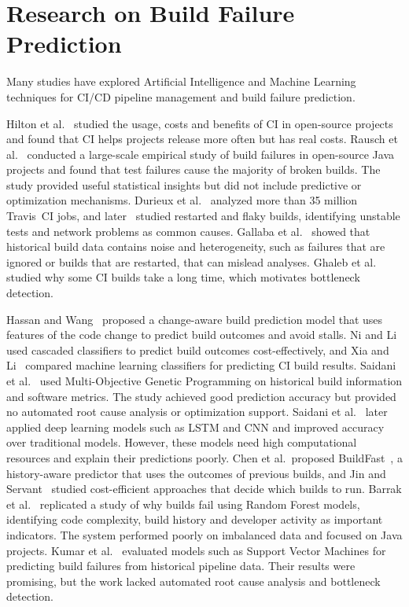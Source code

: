\section{Research on Build Failure Prediction}
\label{sec:research}
Many studies have explored Artificial Intelligence and Machine Learning techniques for CI/CD pipeline management and build failure prediction.

Hilton et al.~\cite{hilton2016usage} studied the usage, costs and benefits of CI in open-source projects and found that CI helps projects release more often but has real costs. Rausch et al.~\cite{rausch2017empirical} conducted a large-scale empirical study of build failures in open-source Java projects and found that test failures cause the majority of broken builds. The study provided useful statistical insights but did not include predictive or optimization mechanisms. Durieux et al.~\cite{durieux2019analysis} analyzed more than 35 million Travis~CI jobs, and later~\cite{durieux2020empirical} studied restarted and flaky builds, identifying unstable tests and network problems as common causes. Gallaba et al.~\cite{gallaba2018noise} showed that historical build data contains noise and heterogeneity, such as failures that are ignored or builds that are restarted, that can mislead analyses. Ghaleb et al.~\cite{ghaleb2019empirical} studied why some CI builds take a long time, which motivates bottleneck detection.

Hassan and Wang~\cite{hassan2017change} proposed a change-aware build prediction model that uses features of the code change to predict build outcomes and avoid stalls. Ni and Li~\cite{ni2017cost} used cascaded classifiers to predict build outcomes cost-effectively, and Xia and Li~\cite{xia2017could} compared machine learning classifiers for predicting CI build results. Saidani et al.~\cite{saidani2020predicting} used Multi-Objective Genetic Programming on historical build information and software metrics. The study achieved good prediction accuracy but provided no automated root cause analysis or optimization support. Saidani et al.~\cite{saidani2022improving} later applied deep learning models such as LSTM and CNN and improved accuracy over traditional models. However, these models need high computational resources and explain their predictions poorly. Chen et al.\ proposed BuildFast~\cite{chen2020buildfast}, a history-aware predictor that uses the outcomes of previous builds, and Jin and Servant~\cite{jin2020cost} studied cost-efficient approaches that decide which builds to run. Barrak et al.~\cite{barrak2021why} replicated a study of why builds fail using Random Forest models, identifying code complexity, build history and developer activity as important indicators. The system performed poorly on imbalanced data and focused on Java projects. Kumar et al.~\cite{kumar2025optimizing} evaluated models such as Support Vector Machines for predicting build failures from historical pipeline data. Their results were promising, but the work lacked automated root cause analysis and bottleneck detection.

